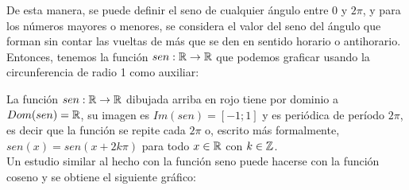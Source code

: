 \documentclass[../Teoría.root.tex]{subfiles}
\begin{document}
        De esta manera, se puede definir el seno de cualquier ángulo entre 0 y \(2\pi\), y para los números mayores o menores, se considera el valor del seno del ángulo que forman sin contar las vueltas de más que se den en sentido horario o antihorario. Entonces, tenemos la función \(sen : \mathbb{R} \rightarrow \mathbb{R}\) que podemos graficar usando la circunferencia de radio 1 como auxiliar:
        \begin{center}
            \begin{scaletikzpicturetowidth}{\linewidth}
            \end{scaletikzpicturetowidth}
        \end{center}
        La función \(sen: \mathbb{R}\rightarrow\mathbb{R}\) dibujada arriba en rojo tiene por dominio a \(Dom(sen) = \mathbb{R}\), su imagen es \(Im(sen) = [−1; 1]\) y es periódica de período \(2\pi\), es decir que la función se repite cada \(2\pi\) o, escrito más formalmente, \(sen(x) = sen(x + 2k\pi)\) para todo \(x \in \mathbb{R}\) con \(k \in \mathbb{Z}\).\\
        Un estudio similar al hecho con la función seno puede hacerse con la función coseno y se obtiene el siguiente gráfico:
        \begin{center}
        \end{center}
\end{document}
